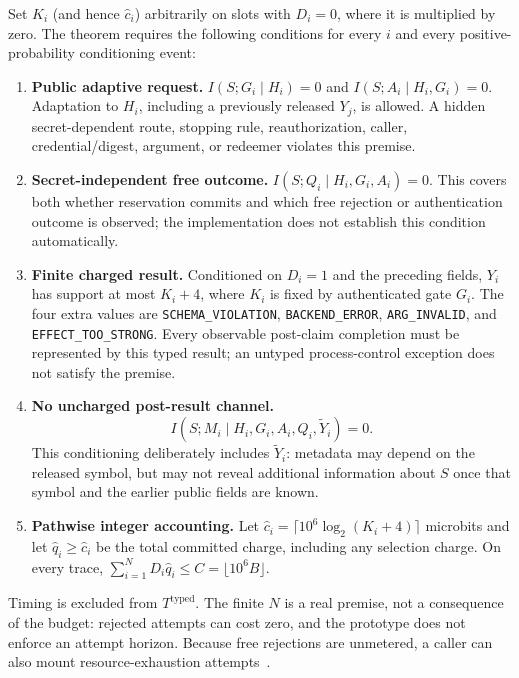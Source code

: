 \documentclass[conference,compsoc]{IEEEtran}
\newcommand{\rev}[1]{#1} %
\begin{document}
{\begin{itemize}
\end{itemize}
Set $K_i$ (and hence $\widehat c_i$) arbitrarily on
slots with $D_i=0$, where it is multiplied by zero.
The theorem requires the following conditions for every $i$ and every
positive-probability conditioning event:
\begin{enumerate}
\item \textbf{Public adaptive request.}
  $I(S;G_i\mid H_i)=0$ and
  $I(S;A_i\mid H_i,G_i)=0$. Adaptation to $H_i$, including a previously
  released $Y_j$, is allowed. A hidden secret-dependent route, stopping
  rule, reauthorization, caller, credential/digest, argument, or redeemer
  violates this premise.
\item \textbf{Secret-independent free outcome.}
  $I(S;Q_i\mid H_i,G_i,A_i)=0$. This covers both whether reservation
  commits and which free rejection or authentication outcome is observed;
  the implementation does not establish this condition automatically.
\item \textbf{Finite charged result.} Conditioned on $D_i=1$ and the
  preceding fields, $Y_i$ has support at most $K_i+4$, where $K_i$ is fixed
  by authenticated gate $G_i$. The four extra values are
  \texttt{SCHEMA\_VIOLATION}, \texttt{BACKEND\_ERROR},
  \texttt{ARG\_INVALID}, and \texttt{EFFECT\_TOO\_STRONG}. Every observable
  post-claim completion must be represented by this typed result; an
  untyped process-control exception does not satisfy the premise.
\item \textbf{No uncharged post-result channel.}
  \[
    I(S;M_i\mid H_i,G_i,A_i,Q_i,\widetilde Y_i)=0.
  \]
  This conditioning deliberately includes $\widetilde Y_i$: metadata may
  depend on the released symbol, but may not reveal additional information
  about $S$ once that symbol and the earlier public fields are known.
\item \textbf{Pathwise integer accounting.} Let
  $\widehat c_i=\lceil10^6\log_2(K_i+4)\rceil$ microbits and let
  $\widehat q_i\ge\widehat c_i$ be the total committed charge, including
  any selection charge. On every trace,
  $\sum_{i=1}^{N}D_i\widehat q_i\le
  C=\lfloor10^6B\rfloor$.
\end{enumerate}
Timing is excluded from $T^{\mathrm{typed}}$. The finite $N$ is a real
premise, not a consequence of the budget: rejected attempts can cost zero,
and the prototype does not enforce an attempt horizon. \rev{Because free rejections are unmetered, a caller can also mount resource-exhaustion attempts~\cite{agentdos2026}.}

}
\end{document}
